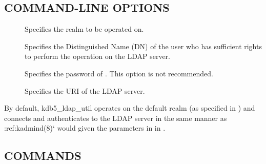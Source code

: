 \documentclass[letterpaper,10pt,english]{sphinxmanual}
\begin{document}
\subsection{COMMAND-LINE OPTIONS}
\label{\detokenize{admin/admin_commands/kdb5_ldap_util:command-line-options}}\label{\detokenize{admin/admin_commands/kdb5_ldap_util:kdb5-ldap-util-options}}\begin{description}
\item[{ }] \leavevmode
Specifies the realm to be operated on.

\item[{ }] \leavevmode
Specifies the Distinguished Name (DN) of the user who has
sufficient rights to perform the operation on the LDAP server.

\item[{ }] \leavevmode
Specifies the password of .  This option is not
recommended.

\item[{ }] \leavevmode
Specifies the URI of the LDAP server.

\end{description}

By default, kdb5\_ldap\_util operates on the default realm (as specified
in {\hyperref[\detokenize{admin/conf_files/krb5_conf:krb5-conf-5}]{}}) and connects and authenticates to the LDAP
server in the same manner as :ref:kadmind(8){}` would given the
parameters in {\hyperref[\detokenize{admin/conf_files/kdc_conf:dbdefaults}]{}} in {\hyperref[\detokenize{admin/conf_files/kdc_conf:kdc-conf-5}]{}}.


\subsection{COMMANDS}
\label{\detokenize{admin/admin_commands/kdb5_ldap_util:kdb5-ldap-util-options-end}}\label{\detokenize{admin/admin_commands/kdb5_ldap_util:commands}}
\end{document}
